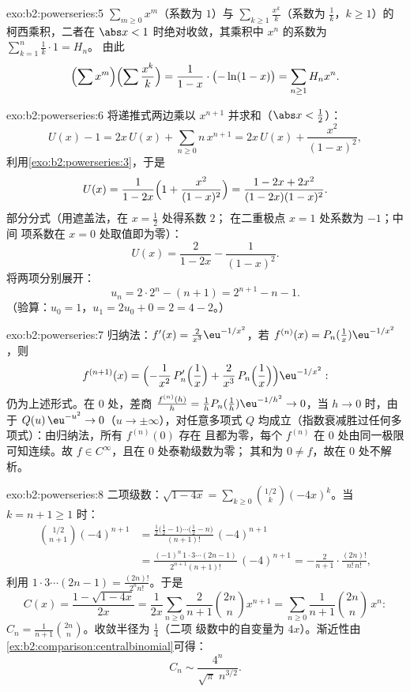 \begin{solution}{exo:b2:powerseries:5}
$\sum_{m \geq 0} x^m$（系数为 $1$）与
$\sum_{k\geq1} \frac{x^k}{k}$（系数为 $\frac1k$，$k \geq
1$）的柯西乘积，二者在 $\abs x < 1$ 时绝对收敛，其乘积中
$x^n$ 的系数为 $\sum_{k=1}^{n} \frac1k \cdot 1 = H_n$。
由此
\[
\Bigl(\sum x^m\Bigr)\Bigl(\sum \frac{x^k}{k}\Bigr)
= \frac{1}{1-x}\cdot\bigl(-\ln(1-x)\bigr)
= \sum_{n\geq1} H_n x^n .
\]
\end{solution}

\begin{solution}{exo:b2:powerseries:6}
将递推式两边乘以 $x^{n+1}$ 并求和（$\abs x <
\frac12$）：
\[
U(x) - 1 = 2x\,U(x) + \sum_{n\geq0} n\,x^{n+1}
= 2x\,U(x) + \frac{x^2}{(1-x)^2} ,
\]
利用\cref{exo:b2:powerseries:3}，于是
\[
U(x) = \frac{1}{1 - 2x}\Bigl(1 + \frac{x^2}{(1-x)^2}\Bigr)
= \frac{1 - 2x + 2x^2}{(1-2x)(1-x)^2} .
\]
部分分式（用遮盖法，在 $x = \frac12$ 处得系数 $2$；
在二重极点 $x = 1$ 处系数为 $-1$；中间
项系数在 $x = 0$ 处取值即为零）：
\[
U(x) = \frac{2}{1-2x} - \frac{1}{(1 - x)^2} .
\]
将两项分别展开：
\[
u_n = 2\cdot 2^n - (n + 1) = 2^{n+1} - n - 1 .
\]
（验算：$u_0 = 1$，$u_1 = 2u_0 + 0 = 2 = 4 - 2$。）
\end{solution}

\begin{solution}{exo:b2:powerseries:7}
归纳法：$f'(x) = \frac{2}{x^3}\eu^{-1/x^2}$，若 $f^{(n)}(x)
= P_n(\tfrac1x)\eu^{-1/x^2}$，则
\[
f^{(n+1)}(x) =
\Bigl(-\frac{1}{x^2}\,P_n'\Bigl(\frac1x\Bigr) +
\frac{2}{x^3}\,P_n\Bigl(\frac1x\Bigr)\Bigr)\eu^{-1/x^2} :
\]
仍为上述形式。在 $0$ 处，差商 $\frac{f^{(n)}(h)}{h} =
\frac1h P_n(\frac1h)\eu^{-1/h^2} \to 0$，当 $h \to 0$ 时，由于
$Q(u)\,\eu^{-u^2} \to 0$（$u \to \pm\infty$），对任意多项式
$Q$ 均成立（指数衰减胜过任何多项式）：由归纳法，所有 $f^{(n)}(0)$ 存在
且都为零，每个 $f^{(n)}$ 在 $0$ 处由同一极限
可知连续。故 $f \in C^\infty$，且在 $0$ 处泰勒级数为零；
其和为 $0 \neq f$，故在 $0$ 处不解析。
\end{solution}

\begin{solution}{exo:b2:powerseries:8}
二项级数：$\sqrt{1-4x} = \sum_{k\geq0}
\binom{1/2}{k}(-4x)^k$。当 $k = n + 1 \geq 1$ 时：
\begin{align*}
\binom{1/2}{n+1}(-4)^{n+1}
&= \frac{\frac12\bigl(\frac12 - 1\bigr)\cdots\bigl(\frac12 -
n\bigr)}{(n+1)!}\,(-4)^{n+1}\\
&= \frac{(-1)^n\,1\cdot3\cdots(2n-1)}{2^{n+1}(n+1)!}\,(-4)^{n+1}
= -\frac{2}{n+1}\cdot\frac{(2n)!}{n!\,n!} ,
\end{align*}
利用 $1\cdot3\cdots(2n-1) = \frac{(2n)!}{2^n n!}$。于是
\[
C(x) = \frac{1 - \sqrt{1-4x}}{2x}
= \frac{1}{2x}\sum_{n\geq0}\frac{2}{n+1}\binom{2n}{n}x^{n+1}
= \sum_{n\geq0} \frac{1}{n+1}\binom{2n}{n}\,x^n :
\]
$C_n = \frac{1}{n+1}\binom{2n}{n}$。收敛半径为 $\frac14$（二项
级数中的自变量为 $4x$）。渐近性由
\cref{ex:b2:comparison:centralbinomial}可得：
\[
C_n \sim \frac{4^n}{\sqrt{\pi}\; n^{3/2}} .
\]
\end{solution}

